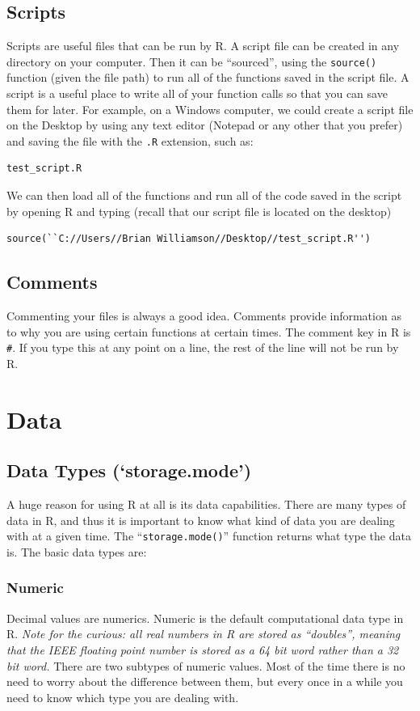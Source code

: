 \documentclass[11pt,letterpaper,fleqn]{report}
\begin{document}
\section{Scripts}
Scripts are useful files that can be run by R. A script file can be created in any directory on your computer. Then it can be ``sourced'', using the \texttt{source()} function (given the file path) to run all of the functions saved in the script file. A script is a useful place to write all of your function calls so that you can save them for later. For example, on a Windows computer, we could create a script file on the Desktop by using any text editor (Notepad or any other that you prefer) and saving the file with the \texttt{.R} extension, such as:
\begin{verbatim}
test_script.R
\end{verbatim}
We can then load all of the functions and run all of the code saved in the script by opening R and typing (recall that our script file is located on the desktop)
\begin{verbatim}
source(``C://Users//Brian Williamson//Desktop//test_script.R'')
\end{verbatim}
\section{Comments}
Commenting your files is always a good idea. Comments provide information as to why you are using certain functions at certain times. The comment key in R is \texttt{\#}. If you type this at any point on a line, the rest of the line will not be run by R.

\chapter{Data}

\section{Data Types (`storage.mode')}
A huge reason for using R at all is its data capabilities. There are many types of data in R, and thus it is important to know what kind of data you are dealing with at a given time. The ``\texttt{storage.mode()}'' function returns what type the data is. The basic data types are:

\subsection{Numeric}
Decimal values are numerics. Numeric is the default computational data type in R. \emph{Note for the curious: all real numbers in R are stored as ``doubles'', meaning that the IEEE floating point number is stored as a 64 bit word rather than a 32 bit word.} There are two subtypes of numeric values. Most of the time there is no need to worry about the difference between them, but every once in a while you need to know which type you are dealing with.
\end{document}
